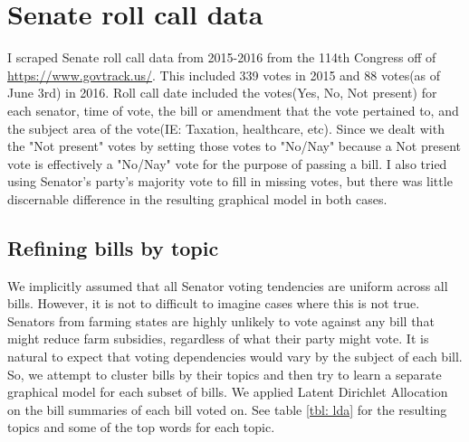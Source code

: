 \documentclass{article}
\begin{document}
\section{Senate roll call data}
I scraped Senate roll call data from 2015-2016 from the 114th Congress off of \href{https://www.govtrack.us/}{https://www.govtrack.us/}. This included 339 votes
in 2015 and 88 votes(as of June 3rd) in 2016. Roll call date included the votes(Yes, No, Not present) for each senator, time of vote, the bill or amendment that
the vote pertained to, and the subject area of the vote(IE: Taxation, healthcare, etc).
Since we dealt with the "Not present" votes by setting those votes to "No/Nay" because a Not present vote is effectively a "No/Nay" vote for the purpose of passing a bill. I also tried using Senator's party's majority vote to fill in missing votes, but there was little discernable difference in the resulting graphical model in both cases.

\subsection{Refining bills by topic}
We implicitly assumed that all Senator voting tendencies are uniform across all bills. However, it is not to difficult to imagine cases where this is not true. Senators from farming states are
highly unlikely to vote against any bill that might reduce farm subsidies, regardless of what their party might vote. 
It is natural to expect that voting dependencies would vary by the subject of each bill. So, we attempt to cluster bills by their topics and then try to learn a separate graphical model for each subset of bills. We applied Latent Dirichlet Allocation on the bill summaries of each bill voted on. See table \ref{tbl: lda} for the resulting topics and some of the top words for each topic.
\end{document}
